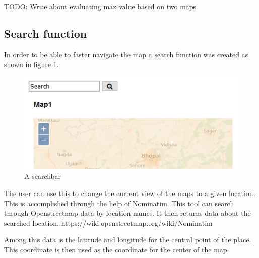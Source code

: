 TODO: Write about evaluating max value based on two maps

\subsection{Search function}
In order to be able to faster navigate the map a search function was created as shown in figure \ref{SearchBar}. 

\begin{figure} [H]
	\centering
	\includegraphics[width=.8\textwidth]{Pictures/SearchBar}
	\caption{A searchbar}
	\label{SearchBar}
\end{figure}

The user can use this to change the current view of the maps to a given location. This is accomplished through the help of Nominatim. This tool can search through Openstreetmap data by location names. It then returns data about the searched location. 
https://wiki.openstreetmap.org/wiki/Nominatim

Among this data is the latitude and longitude for the central point of the place.    
This coordinate is then used as the coordinate for the center of the map.
